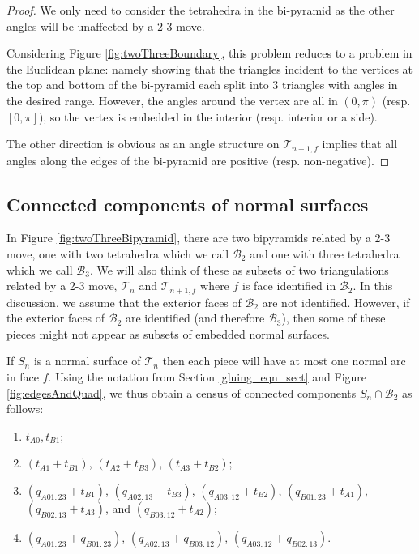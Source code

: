 \documentclass[12pt,reqno]{amsart}  %
\theoremstyle{definition}
\theoremstyle{remark}
\newcommand{\T}{\mathcal{T}}
\def\BTwo{\mathcal{B}_2}
\def\BThree{\mathcal{B}_3}
\begin{document}
\begin{proof}
We only need to consider the tetrahedra in the bi-pyramid as the other 
angles will be unaffected by a 2-3 move. 

Considering Figure \ref{fig:twoThreeBoundary}, this problem reduces to a 
problem in the Euclidean plane: namely showing that the triangles incident 
to the vertices at the top and bottom of the bi-pyramid each split into 3 
triangles with angles in the desired range. However, the angles
around the vertex are all in $(0,\pi)$ (resp. $[0,\pi]$), so the vertex 
is embedded in the interior (resp. interior or a side). 

The other direction is obvious as an angle structure on $\T_{n+1,f}$ implies 
that all angles along the edges of the bi-pyramid are positive (resp. 
non-negative). 
\end{proof}

\subsection{Connected components of normal surfaces}

In Figure \ref{fig:twoThreeBipyramid}, there are two bipyramids related by 
a 2-3 move, one with two tetrahedra which we call $\BTwo$ and one with 
three tetrahedra which we call $\BThree$. We will also think of these as 
subsets of two triangulations related by a 2-3 move, $\T_n$ and $\T_{n+1,f}$ 
where $f$ is face identified in $\BTwo$. In this discussion, we assume that 
the exterior faces of $\BTwo$ are not identified. However, if the exterior 
faces of $\BTwo$ are identified (and therefore $\BThree$), then some of 
these pieces might not appear as subsets of embedded normal surfaces.

If $S_n$ is a normal surface of $\T_n$ then each piece will have at most 
one normal arc in face $f$. Using the notation from 
Section \ref{gluing_eqn_sect} and Figure \ref{fig:edgesAndQuad}, 
we thus obtain a census of connected components $S_n \cap \BTwo$ as follows: 

\begin{enumerate}
\item  
$t_{A0},t_{B1}$;
\item  
$(t_{A1}+t_{B1})$, $(t_{A2}+t_{B3})$, $(t_{A3}+t_{B2})$;
\item  
$(q_{A01:23}+t_{B1})$, $(q_{A02:13}+t_{B3})$, $(q_{A03:12}+t_{B2})$, 
$(q_{B01:23}+t_{A1})$, $(q_{B02:13}+t_{A3})$, and $(q_{B03:12}+t_{A2})$;
\item  
$(q_{A01:23}+q_{B01:23})$, $(q_{A02:13}+q_{B03:12})$,  $(q_{A03:12}+q_{B02:13})$.
\end{enumerate}
\end{document}
